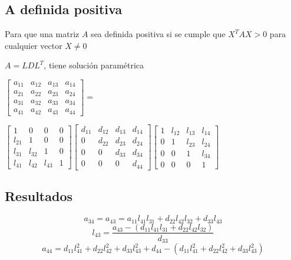 \subsection*{A definida positiva}
Para que una matriz $A$ sea definida positiva si se cumple que $X^TAX>0$ para cualquier vector $X\neq0$
\begin{center}
$A=LDL^T$, tiene soluci\'on param\'etrica
\end{center}
\begin{center}
$\begin{bmatrix}
a_{11} & a_{12} & a_{13} & a_{14} \\
a_{21} & a_{22} & a_{23} & a_{24} \\
a_{31} & a_{32} & a_{33} & a_{34} \\
a_{41} & a_{42} & a_{43} & a_{44} 
\end{bmatrix}=$ \end{center}\begin{center}
$\begin{bmatrix}
1 & 0 & 0 & 0 \\
l_{21} & 1 & 0 & 0 \\
l_{31} & l_{32} & 1 & 0 \\
l_{41} & l_{42} & l_{43} & 1 
\end{bmatrix} \begin{bmatrix}
d_{11} & d_{12} & d_{13} & d_{14} \\
0 & d_{22} & d_{23} & d_{24} \\
0 & 0 & d_{33} & d_{34} \\
0 & 0 & 0 & d_{44} 
\end{bmatrix} \begin{bmatrix}
1 & l_{12} & l_{13} & l_{14} \\
0 & 1 & l_{23} & l_{24} \\
0 & 0 & 1 & l_{34} \\
0 & 0 & 0 & 1
\end{bmatrix}
$\end{center}
\subsection*{Resultados}
\begin{displaymath}a_{34}=a_{43}=a_{11}l_{41}l_{31}+d_{22}l_{42}l_{32}+d_{33}l_{43}\end{displaymath}
\begin{displaymath}l_{43}=\frac{a_{43}-(d_{11}l_{41}l_{31}+d_{22}l_{42}l_{32})}{d_{33}}\end{displaymath}
\begin{displaymath}a_{44}=d_{11}l_{41}^2+d_{22}l_{42}^2+d_{33}l_{43}^2+d_{44}-(d_{11}l_{41}^2+d_{22}l_{42}^2+d_{33}l_{43}^2)\end{displaymath}
